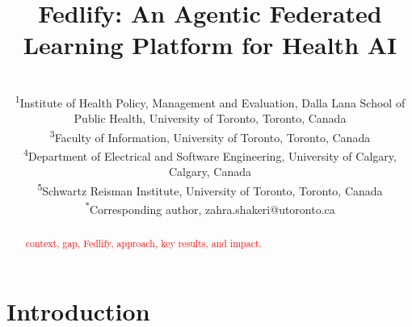 \documentclass[preprint,5p, 10pt, times]{elsarticle}
\begin{document}
\sloppy

\begin{frontmatter}

\title{\Large \bf Fedlify: An Agentic Federated Learning Platform for Health AI}

\author{
    \textbf{\fontsize{11pt}{13.3pt}} 
    \\
    \small\normalfont
    \textsuperscript{1}{Institute of Health Policy, Management and Evaluation, Dalla Lana School of Public Health, University of Toronto, Toronto, Canada} \\
    \textsuperscript{3}{Faculty of Information, University of Toronto, Toronto, Canada} \\
\textsuperscript{4}{Department of Electrical and Software Engineering, University of Calgary, Calgary, Canada} \\
\textsuperscript{5}{Schwartz Reisman Institute, University of Toronto, Toronto, Canada} \\
    \textsuperscript{*}{Corresponding author, zahra.shakeri@utoronto.ca}
}


\begin{abstract}
\centering\begin{minipage}{\dimexpr\paperwidth-3cm}


\textcolor{red}{context, gap, Fedlify, approach, key results, and impact.}

\end{minipage}

\end{abstract}


\end{frontmatter}

\section*{Introduction}
\label{S:Intro}
\end{document}
